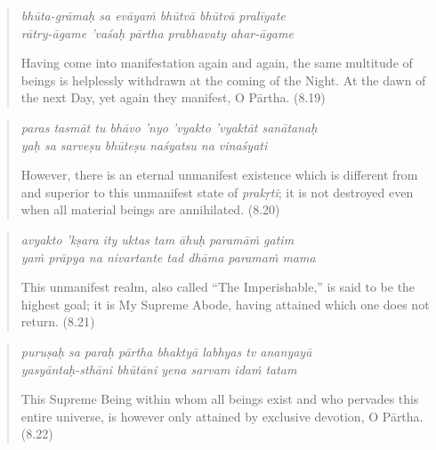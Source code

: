 \documentclass[12pt, twoside, openright]{memoir}
\begin{document}
\par
\begin{verse}
\textit{bhūta-grāmaḥ sa evāyaṁ bhūtvā bhūtvā pralīyate} \\
\textit{rātry-āgame ’vaśaḥ pārtha prabhavaty ahar-āgame}

\noindent Having come into manifestation again and again, the same multitude of beings is helplessly withdrawn at the coming of the Night. At the dawn of the next Day, yet again they manifest, O Pārtha. (8.19)
\end{verse}
\par



\par
\begin{verse}
\textit{paras tasmāt tu bhāvo ’nyo ’vyakto ’vyaktāt sanātanaḥ} \\
\textit{yaḥ sa sarveṣu bhūteṣu naśyatsu na vinaśyati}

\noindent However, there is an eternal unmanifest existence which is different from and superior to this unmanifest state of \textit{prakṛti}; it is not destroyed even when all material beings are annihilated. (8.20)
\end{verse}
\par



\par
\begin{verse}
\textit{avyakto ’kṣara ity uktas tam āhuḥ paramāṁ gatim} \\
\textit{yaṁ prāpya na nivartante tad dhāma paramaṁ mama}

\noindent This unmanifest realm, also called \enquote{The Imperishable,} is said to be the highest goal; it is My Supreme Abode, having attained which one does not return. (8.21)
\end{verse}
\par



\par
\begin{verse}
\textit{puruṣaḥ sa paraḥ pārtha bhaktyā labhyas tv ananyayā} \\
\textit{yasyāntaḥ-sthāni bhūtāni yena sarvam idaṁ tatam}

\noindent This Supreme Being within whom all beings exist and who pervades this entire universe, is however only attained by exclusive devotion, O Pārtha. (8.22)
\end{verse}
\par
\end{document}
